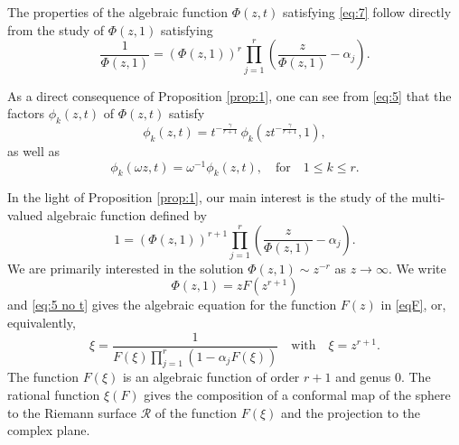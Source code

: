 \documentclass[12pt]{article}
\numberwithin{equation}{section}
\begin{document}
The properties of the algebraic function $\Phi(z,t)$ satisfying \eqref{eq:7} follow directly from the study of  $\Phi(z,1)$ satisfying 
\begin{equation}\label{Phi 1}
	\frac{1}{\Phi(z,1)} 
	= \left(\Phi(z,1)\right)^r \prod_{j=1}^r \left(\frac{z}{\Phi(z,1)} - \alpha_j\right) .
\end{equation}


As a direct consequence of Proposition \ref{prop:1}, one can see from  \eqref{eq:5} that the factors $\phi_k(z,t)$ of $\Phi(z,t)$ satisfy 
\begin{equation*}
	\phi_k(z,t) = t^{-\frac{\gamma}{r+1}} \, \phi_k(z t^{-\frac{\gamma}{r+1}},1),
\end{equation*}
as well as 
\begin{equation*}
	\phi_k(\omega z,t) = \omega^{-1} \phi_k(z,t), \quad\text{for}\quad 1\leq k \leq r.
\end{equation*}

In the light of Proposition \ref{prop:1}, our main interest is the study of the multi-valued algebraic function defined by  
\begin{equation}\label{eq:5 no t}
		1= \left( \Phi(z,1) \right)^{r+1} \prod_{j=1}^r \left(\frac{z}{\Phi(z,1)} -\alpha_j\right) .
\end{equation}
We are primarily interested in the solution  $\Phi(z,1) \sim z^{-r}$ as $z \to \infty$.
%
We write 
\begin{equation}
\label{Phi z F}
	\Phi(z,1) = z F(z^{r+1})
\end{equation}
and \eqref{eq:5 no t} gives the algebraic equation for the function $F(z)$ in \eqref{eqF}, 
or, equivalently, 
\begin{equation} \label{eqF2}
	\xi = \frac{1}{ F(\xi)  \prod\limits_{j=1}^r \left(1 -\alpha_j F(\xi)\right) } \quad \text{with}\quad  \xi=z^{r+1}. 
\end{equation}
The function $F(\xi)$ is an algebraic function of order $r+1$ and genus $0$. The rational function $\xi(F)$ gives the composition of a conformal map of the sphere to the Riemann surface $\mathcal{R}$ of the function $F(\xi)$ and the projection to the complex plane. 

%
%
\end{document}
